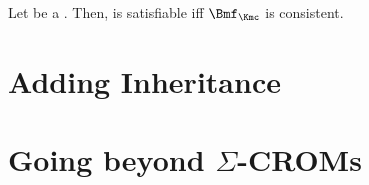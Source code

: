 \begin{theorem}
  Let \Kmc be a \SCCROM. Then, \Kmc is satisfiable iff $\Bmf_{\Kmc}$ is consistent.
\end{theorem}

\missingproof[5cm]





\clearpage

\section{Adding Inheritance}
\label{sec:adding-inheritance}



\section{Going beyond \texorpdfstring{$\Sigma$}{Sigma}-CROMs}
\label{sec:going-beyond-crom}









